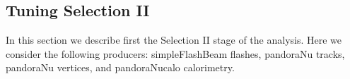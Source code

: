 %
%
%
%


\subsection{Tuning Selection II}
In this section we describe first the Selection II stage of the analysis.  Here we consider the following producers: simpleFlashBeam flashes, pandoraNu tracks, pandoraNu vertices, and pandoraNucalo calorimetry.

